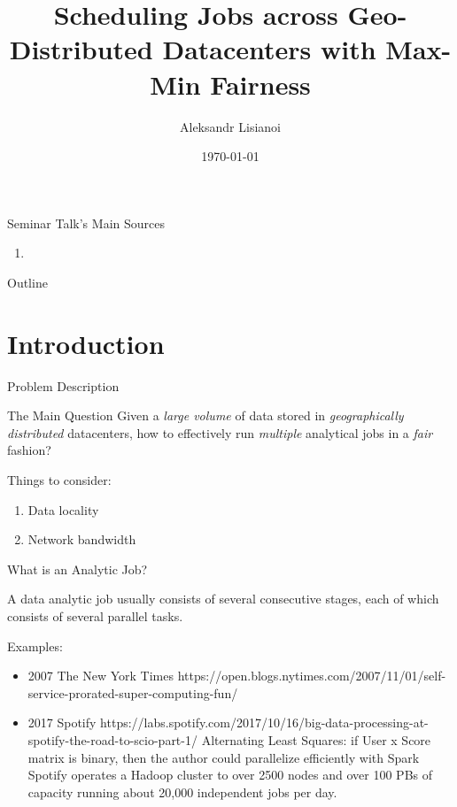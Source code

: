 \documentclass[presentation,professionalfonts]{beamer}
\institute[TU Wien]{Seminar ``\semname''\\\semester}
\date{\today}
\title[Scheduling Jobs with Max-Min Fairness]{Scheduling Jobs across Geo-Distributed Datacenters with Max-Min Fairness}
\author[Aleksandr Lisianoi]{Aleksandr Lisianoi}
\begin{document}
\maketitle


\begin{frame}{Seminar Talk's Main Sources}
  \begin{enumerate}
  \item {}
  \end{enumerate}
\end{frame}

\begin{frame}{Outline}
  \tableofcontents
\end{frame}

\section{Introduction}

\begin{frame}{Problem Description}
  \begin{block}{The Main Question}
    Given a \emph{large volume} of data stored in \emph{geographically distributed} datacenters, how to effectively run \emph{multiple} analytical jobs in a \emph{fair} fashion?
    \end{block}

  Things to consider:

  \begin{enumerate}
    \item Data locality
    \item Network bandwidth
  \end{enumerate}
\end{frame}

\begin{frame}{What is an Analytic Job?}

  A data analytic job usually consists of several consecutive stages, each of which consists of several parallel tasks.

  Examples:
  \begin{itemize}
  \item 2007 The New York Times https://open.blogs.nytimes.com/2007/11/01/self-service-prorated-super-computing-fun/
  \item 2017 Spotify https://labs.spotify.com/2017/10/16/big-data-processing-at-spotify-the-road-to-scio-part-1/
    Alternating Least Squares: if User x Score matrix is binary, then the author could parallelize efficiently with Spark
    Spotify operates a Hadoop cluster to over 2500 nodes and over 100 PBs of capacity running about 20,000 independent jobs per day.
    \end{itemize}

\end{frame}
\end{document}
